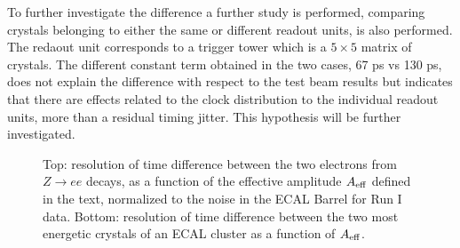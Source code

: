 \documentclass[journal]{IEEEtran}
\begin{document}
%
To further investigate the difference a further study is performed, comparing crystals belonging to either the same or different readout units, is also performed. The redaout unit corresponds to a trigger tower which is a $5 \times 5$ matrix of crystals.  The different constant term obtained in the two cases, 67 ps vs 130 ps, does not explain the difference with respect to the test beam results but indicates that there are effects related to the clock distribution to the individual readout units, more than a residual timing jitter. This hypothesis will be further investigated.
%
\begin{figure}[!t]
  \begin{center}
    \caption{Top: resolution of time difference between the two electrons from $Z\to ee$ decays, as a function of the effective amplitude $A_{\rm eff}$ defined in the text, normalized to the noise in the ECAL Barrel for Run I data. Bottom: resolution of time difference between the two most energetic crystals of an ECAL cluster as a function of $A_{\rm eff}$. \label{fig:time_resol}}
  \end{center}
\end{figure}
%
\end{document}
